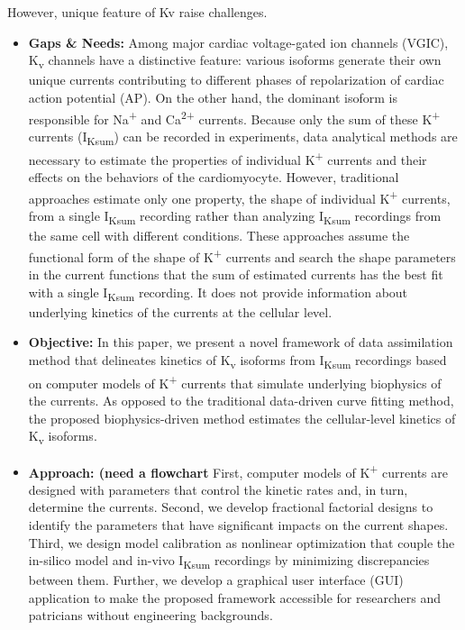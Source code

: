\documentclass[11pt]{article}
\begin{document}
However, unique feature of Kv raise challenges.
\begin{itemize}
    \item \textbf{Gaps \& Needs:} Among major cardiac voltage-gated ion channels (VGIC), K\textsubscript{v} channels have a distinctive feature: various isoforms generate their own unique currents contributing to different phases of repolarization of cardiac action potential (AP). On the other hand, the dominant isoform is responsible for Na\textsuperscript{+} and Ca\textsuperscript{2+} currents. Because only the sum of these K\textsuperscript{+} currents (I\textsubscript{Ksum}) can be recorded in experiments, data analytical methods are necessary to estimate the properties of individual K\textsuperscript{+} currents and their effects on the behaviors of the cardiomyocyte. However, traditional approaches estimate only one property, the shape of individual K\textsuperscript{+} currents, from a single I\textsubscript{Ksum} recording rather than analyzing I\textsubscript{Ksum} recordings from the same cell with different conditions. These approaches assume the functional form of the shape of K\textsuperscript{+} currents and search the shape parameters in the current functions that the sum of estimated currents has the best fit with a single I\textsubscript{Ksum} recording. It does not provide information about underlying kinetics of the currents at the cellular level.
    \item \textbf{Objective:} In this paper, we present a novel framework of data assimilation method that delineates kinetics of K\textsubscript{v} isoforms from I\textsubscript{Ksum} recordings based on computer models of K\textsuperscript{+} currents that simulate underlying biophysics of the currents. As opposed to the traditional data-driven curve fitting method, the proposed biophysics-driven method estimates the cellular-level kinetics of K\textsubscript{v} isoforms.
    \item \textbf{Approach: (need a flowchart} First, computer models of K\textsuperscript{+} currents are designed with parameters that control the kinetic rates and, in turn, determine the currents. Second, we develop fractional factorial designs to identify the parameters that have significant impacts on the current shapes. Third, we design model calibration as nonlinear optimization that couple the in-silico model and in-vivo I\textsubscript{Ksum} recordings by minimizing discrepancies between them. Further, we develop a graphical user interface (GUI) application to make the proposed framework accessible for researchers and patricians without engineering backgrounds.

\end{itemize}
\end{document}
